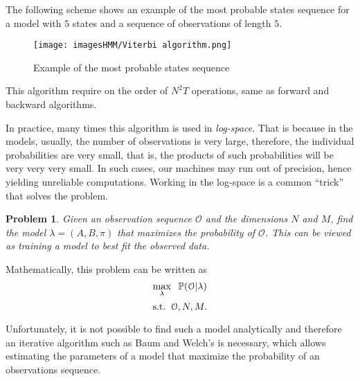\documentclass[12pt]{article}
\newtheorem{problem}{Problem}
\def\OO{\mathcal{O}}
\def\PP{\mathbb{P}}
\numberwithin{equation}{section}
\begin{document}
The following scheme shows an example of the most probable states sequence for a model with $5$ states and a sequence of observations of length $5$.
\begin{figure}[H]
\centering
\texttt{[image: imagesHMM/Viterbi algorithm.png]}
\caption{Example of the most probable states sequence}
\label{fig:example Viterbi}
\end{figure}

This algorithm require on the order of $N^{2}T$ operations, same as forward and backward algorithms.

In practice, many times this algorithm is used in \emph{log-space}. That is because in the models, usually, the number of observations is very large, therefore, the individual probabilities are very small, that is, the products of such probabilities will be very very very small. In such cases, our machines may run out of precision, hence yielding unreliable computations. Working in the log-space is a common “trick” that solves the problem.


\begin{problem}\label{Problem 3}
    Given an observation sequence $\OO$ and the dimensions $N$ and $M$, find the model $\lambda = (A, B, \pi)$ that maximizes the probability of $\OO$. This can be viewed as training a model to best fit the observed data.
\end{problem}

Mathematically, this problem can be written as
\[\max_{\lambda}\hspace{2mm} \PP(\OO| \lambda)\]
\[\text{s.t.}\hspace{2mm} \OO, N, M.\]


Unfortunately, it is not possible to find such a model analytically and therefore an iterative algorithm such as Baum and Welch's is necessary, which allows estimating the parameters of a model that maximize the probability of an observations sequence.
\end{document}
